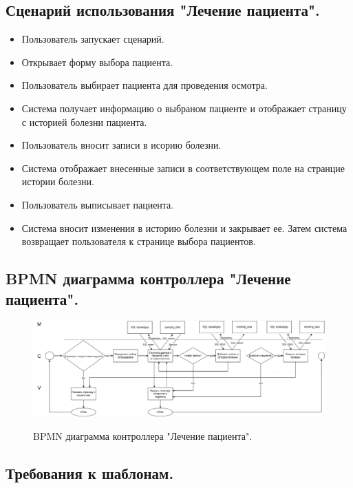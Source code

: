 \documentclass[12pt, a4paper]{article}
\begin{document}
   \subsection{Сценарий использования "Лечение пациента".}
   
   \begin{itemize}
   	\item {Пользователь запускает сценарий.}
   	\item {Открывает форму выбора пациента.}
   	\item {Пользователь выбирает пациента для проведения осмотра.}
   	\item {Система получает информацию о выбраном пациенте и отображает страницу с историей болезни пациента.}
   	\item {Пользователь вносит записи в исорию болезни.}
   	\item {Система отображает внесенные записи в соответствующем поле на странцие истории болезни.}
   	\item {Пользователь выписывает пациента.}
   	\item {Система вносит изменения в историю болезни и закрывает ее. Затем система возвращает пользователя к странице выбора пациентов.}
   \end{itemize}

    \subsection{BPMN диаграмма контроллера "Лечение пациента".}
    \begin{figure}[h]
    	\centering    %
    	\includegraphics[width=1\textwidth]{pictures/treatment.png}
    	\label{fig:pic11} %
    	\caption{BPMN диаграмма контроллера "Лечение пациента".}
    \end{figure}

    \subsection{Требования к шаблонам.}
\end{document}
